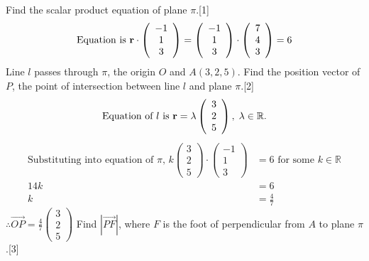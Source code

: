 \documentclass[12pt, a4 paper]{article}
\begin{document}
\begin{outline}[enumerate]
					\color{black}
					\2 Find the scalar product equation of plane $\pi $.\hfill[1]
					\color{blue}
					\[{\textrm{Equation is }}{\bf{r}} \cdot \left( {\begin{array}{*{20}{c}}{ - 1}\\1\\3\end{array}} \right) = \left( {\begin{array}{*{20}{c}}{ - 1}\\1\\3\end{array}} \right) \cdot \left( {\begin{array}{*{20}{c}}7\\4\\3\end{array}} \right) = 6\]
					\color{black}
					\2 Line ${l}$ passes through $\pi $, the origin $O$ and $A(3,2,5)$. Find the position vector of $P$, the point of intersection between line ${l}$ and plane $\pi $.\hfill[2]	
					\color{blue}
					\[{\textrm{Equation of }}l{\textrm{ is }}{\bf{r}} = \lambda \left( {\begin{array}{*{20}{c}}3\\2\\5\end{array}} \right),\;\lambda  \in \mathbb{R}.\]
					\begin{align*}
						{\textrm{Substituting into equation of }}\pi {\textrm{, }}k\left( {\begin{array}{*{20}{c}}3 \\2\\5\end{array}} \right) \cdot \left( {\begin{array}{*{20}{c}}{ - 1}\\1\\3\end{array}} \right) &= 6{\textrm{ for some }}k \in \mathbb{R}\\14k &= 6\\k &= \frac{4}{7}
					\end{align*}
					$\therefore \overrightarrow {OP}  = \frac{4}{7}\left( {\begin{array}{*{20}{c}}3\\2\\5\end{array}} \right)$
					\color{black}
					\2 Find $\left| {\overrightarrow {PF} } \right|$, where $F$ is the foot of perpendicular from $A$ to plane $\pi $.\hfill[3]
					\color{blue}
					\begin{align*}

\end{align*}
\end{outline}
\end{document}
